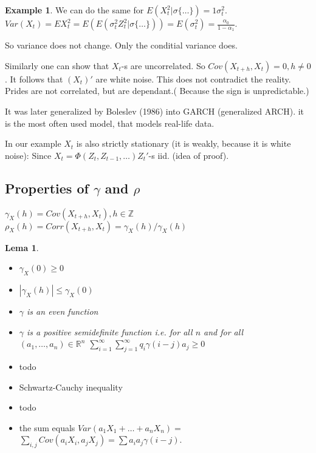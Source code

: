 \documentclass[12pt,a4paper]{amsart}
\theoremstyle{definition} %
\newtheorem{example}[defn]{Example}
\theoremstyle{plain} %
\newtheorem{lema}[defn]{Lema}
\newcommand{\R}{\mathbb R}
\newcommand{\Z}{\mathbb Z}
\begin{document}
\begin{example}
We can do the same for $E(X_t^2 | \sigma\{\dots\}) = 1 \sigma_t^2$.
$Var(X_t) = EX_t^2 = E(E(\sigma_t^2 Z_t^2 | \sigma\{\dots\})) = E(\sigma_t^2) = \frac{\alpha_0}{1 - \alpha_1}$.

So variance does not change. Only the conditial variance does.

Similarly one can show that $X_t$-s are uncorrelated. So $Cov(X_{t+ h}, X_t) = 0, h \neq 0$. It follows that $(X_t)'$ are white noise. This does not contradict the reality. Prides are not correlated, but are dependant.( Because the sign is unpredictable.)


It was later generalized by Boleslev (1986) into GARCH (generalized ARCH). it is the most often used model, that models real-life data.

In our example $X_t$ is also strictly stationary (it is weakly, because it is white noise):
Since $X_t = \Phi(Z_t, Z_{t-1}, \dots) Z_t'$-s iid. (idea of proof). 
\end{example}

\subsection{Properties of $\gamma$ and $\rho$}

$\gamma_X(h) = Cov(X_{t+h}, X_t), h \in \Z$
$\rho_X(h) = Corr(X_{t+h},X_t) = \gamma_X(h) / \gamma_X(h)$

\begin{lema}
\begin{itemize}
\item $\gamma_X(0) \geq 0$
\item $|\gamma_X(h)| \leq \gamma_X(0)$
\item $\gamma$ is an even function
\item $\gamma$ is a positive semidefinite function i.e. for all $n$ and for all $(a_1, \dots, a_n) \in \R^n$ 
$\sum_{i=1}^\infty \sum_{j=1 }^\infty q_i \gamma(i -j) a_j \geq 0$ 
\end{itemize}
\end{lema}

\proof
\begin{itemize}
\item todo
\item Schwartz-Cauchy inequality
\item todo
\item the sum equals $Var(a_1X_1 + \dots + a_n X_n) =$
$ \sum_{i,j} Cov(a_iX_i,a_jX_j) = \sum a_i a_j \gamma(i-j)$. 
\end{itemize}
\endproof
\end{document}
